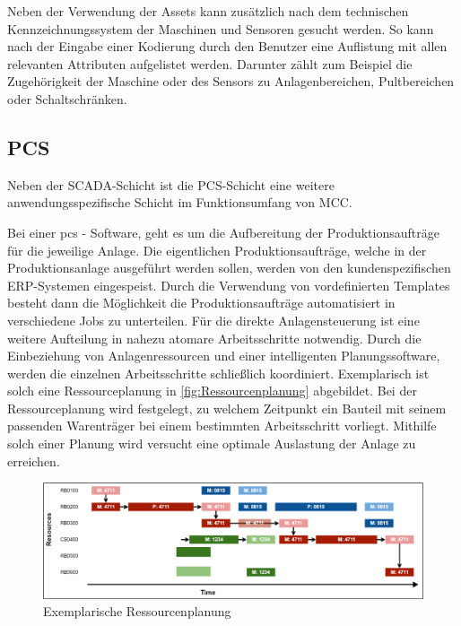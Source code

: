Neben der Verwendung der Assets kann zusätzlich nach dem technischen Kennzeichnungssystem der Maschinen und Sensoren gesucht werden. So kann nach der Eingabe einer Kodierung durch den Benutzer eine Auflistung mit allen relevanten Attributen aufgelistet werden. Darunter zählt zum Beispiel die Zugehörigkeit der Maschine oder des Sensors zu Anlagenbereichen, Pultbereichen oder Schaltschränken.


\subsection{PCS\label{subsec3.1.4:Unterunterpunkt-4}}

Neben der \glqq SCADA\grqq{}-Schicht ist die \glqq PCS\grqq{}-Schicht eine weitere anwendungsspezifische Schicht im Funktionsumfang von MCC.

Bei einer \gls{pcs} - Software, geht es um die Aufbereitung der Produktionsaufträge für die jeweilige Anlage. Die eigentlichen Produktionsaufträge, welche in der Produktionsanlage ausgeführt werden sollen, werden von den kundenspezifischen ERP-Systemen eingespeist. Durch die Verwendung von vordefinierten Templates besteht dann die Möglichkeit die Produktionsaufträge automatisiert in verschiedene Jobs zu unterteilen. Für die direkte Anlagensteuerung ist eine weitere Aufteilung in nahezu atomare Arbeitsschritte notwendig. Durch die Einbeziehung von Anlagenressourcen und einer intelligenten Planungssoftware, werden die einzelnen Arbeitsschritte schließlich koordiniert. Exemplarisch ist solch eine Ressourceplanung in \autoref{fig:Ressourcenplanung} abgebildet. Bei der Ressourceplanung wird festgelegt, zu welchem Zeitpunkt ein Bauteil mit seinem passenden Warenträger bei einem bestimmten Arbeitsschritt vorliegt. Mithilfe solch einer Planung wird versucht eine optimale Auslastung der Anlage zu erreichen.

\begin{figure}[H]
    \centering
    \includegraphics[width=0.9\linewidth]{images/Ressourcenplanung.png}
    \caption{Exemplarische Ressourcenplanung \cite{EniscobyForcamGmbH.2021}\protect\footnotemark}
    \label{fig:Ressourcenplanung}
\end{figure}

